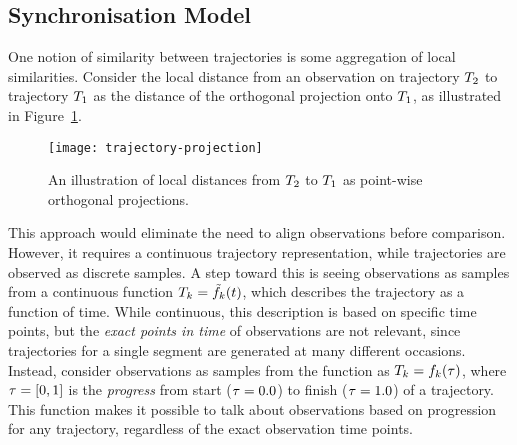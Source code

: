 \subsection{Synchronisation Model}
One notion of similarity between trajectories is some aggregation of
local similarities. Consider the local distance from an observation on trajectory
$T_2$ to trajectory $T_1$ as the distance of the orthogonal
projection onto $T_1$, as illustrated in Figure~\ref{fig:trajectory-projection}.
\begin{figure}
  \centering
  \texttt{[image: trajectory-projection]}
  \caption{An illustration of local distances from $T_2$ to
  $T_1$ as point-wise orthogonal projections.}\label{fig:trajectory-projection}
\end{figure}
This approach would eliminate the need to align observations before
comparison. However, it requires a continuous trajectory
representation, while trajectories are observed as discrete samples.
A step toward this is seeing observations as samples from a continuous function
$T_{k} = \tilde{f}_{k}(t)$, which describes the trajectory as a function of
time. While continuous, this description is based on specific time
points, but the \textit{exact points in time} of observations are not
relevant, since trajectories for a single segment are generated at many different
occasions. Instead, consider observations as samples from the function
as $T_{k} = f_{k}(\tau)$, where $\tau = [0, 1]$ is the \textit{progress} from
start ($\tau = 0.0$) to finish ($\tau = 1.0$) of
a trajectory. This function makes it possible to talk about observations based on
progression for any trajectory, regardless of the exact observation time points. 

